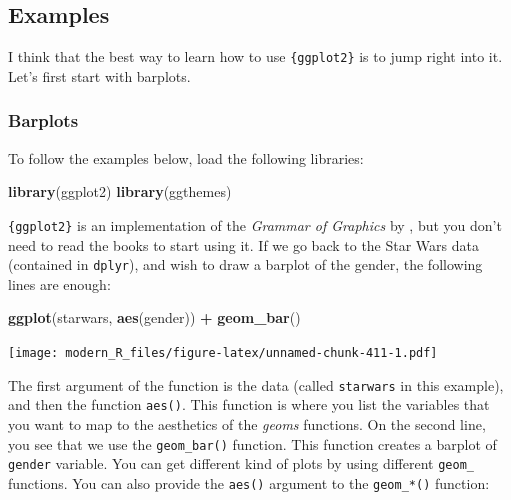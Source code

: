 \documentclass[]{gitbook}
\newenvironment{Shaded}{\begin{snugshade}}{\end{snugshade}}
\newcommand{\KeywordTok}[1]{\textcolor[rgb]{0.13,0.29,0.53}{\textbf{#1}}}
\newcommand{\NormalTok}[1]{#1}
\newcommand{\OperatorTok}[1]{\textcolor[rgb]{0.81,0.36,0.00}{\textbf{#1}}}
\newcommand{\StringTok}[1]{\textcolor[rgb]{0.31,0.60,0.02}{#1}}
\begin{document}
\hypertarget{examples}{%
\subsection{Examples}\label{examples}}

I think that the best way to learn how to use \texttt{\{ggplot2\}} is to jump right into it. Let's first start with
barplots.

\hypertarget{barplots}{%
\subsubsection{Barplots}\label{barplots}}

To follow the examples below, load the following libraries:

\begin{Shaded}
\begin{Highlighting}[]
\KeywordTok{library}\NormalTok{(ggplot2)}
\KeywordTok{library}\NormalTok{(ggthemes)}
\end{Highlighting}
\end{Shaded}

\texttt{\{ggplot2\}} is an implementation of the \emph{Grammar of Graphics} by \citet{wilkinson2006}, but you don't need
to read the books to start using it. If we go back to the Star Wars data (contained in \texttt{dplyr}),
and wish to draw a barplot of the gender, the following lines are enough:

\begin{Shaded}
\begin{Highlighting}[]
\KeywordTok{ggplot}\NormalTok{(starwars, }\KeywordTok{aes}\NormalTok{(gender)) }\OperatorTok{+}
\StringTok{  }\KeywordTok{geom_bar}\NormalTok{()}
\end{Highlighting}
\end{Shaded}

\texttt{[image: modern\_R\_files/figure-latex/unnamed-chunk-411-1.pdf]}

The first argument of the function is the data (called \texttt{starwars} in this example), and then the
function \texttt{aes()}. This function is where you list the variables that you want to map to the aesthetics
of the \emph{geoms} functions. On the second line, you see that we use the \texttt{geom\_bar()} function. This
function creates a barplot of \texttt{gender} variable.
You can get different kind of plots by using different \texttt{geom\_} functions. You can also provide the
\texttt{aes()} argument to the \texttt{geom\_*()} function:
\end{document}
